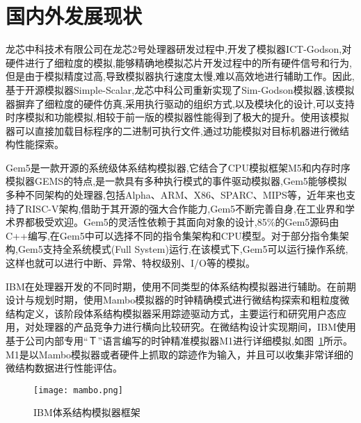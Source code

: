 \section{国内外发展现状}
龙芯中科技术有限公司在龙芯2号处理器研发过程中,开发了模拟器ICT-Godson\cite{gao2007simos},对硬件进行了细粒度的模拟,能够精确地模拟芯片开发过程中的所有硬件信号和行为,但是由于模拟精度过高,导致模拟器执行速度太慢,难以高效地进行辅助工作。因此,基于开源模拟器Simple-Scalar\cite{austin2002simplescalar},龙芯中科公司重新实现了Sim-Godson模拟器\cite{zhang2007sim},该模拟器摒弃了细粒度的硬件仿真,采用执行驱动的组织方式,以及模块化的设计,可以支持时序模拟和功能模拟\cite{zhang2007sim},相较于前一版的模拟器性能得到了极大的提升。使用该模拟器可以直接加载目标程序的二进制可执行文件,通过功能模拟对目标机器进行微结构性能探索\cite{desikan2001sim}。

Gem5是一款开源的系统级体系结构模拟器,它结合了CPU模拟框架M5和内存时序模拟器GEMS的特点,是一款具有多种执行模式的事件驱动模拟器\cite{许鹏2006一种应用于嵌入式系统中断控制},Gem5能够模拟多种不同架构的处理器,包括Alpha、ARM、X86、SPARC、MIPS等，近年来也支持了RISC-V架构,借助于其开源的强大合作能力,Gem5不断完善自身,在工业界和学术界都极受欢迎。Gem5的灵活性依赖于其面向对象的设计,85\%的Gem5源码由C++编写,在Gem5中可以选择不同的指令集架构和CPU模型。对于部分指令集架构,Gem5支持全系统模式(Full System)运行,在该模式下,Gem5可以运行操作系统,这样也就可以进行中断、异常、特权级别、I/O等的模拟。


IBM在处理器开发的不同时期，使用不同类型的体系结构模拟器进行辅助。在前期设计与规划时期，使用Mambo\cite{boh}模拟器的时钟精确模式进行微结构探索和粗粒度微结构定义，该阶段体系结构模拟器采用踪迹驱动方式\cite{ceze2003full}，主要运行和研究用户态应用，对处理器的产品竞争力进行横向比较研究\cite{kistlerexperiences}。在微结构设计实现期间，IBM使用基于公司内部专用“Ｔ”语言\cite{asaad2012cycle,chaix2019implementation}编写的时钟精准模拟器M1进行详细模拟\cite{kistlerexperiences},如图~\ref{fig:IBM}所示。M1是以Mambo模拟器或者硬件上抓取的踪迹作为输入，并且可以收集非常详细的微结构数据进行性能评估\cite{magnusson2002simics}。
\begin{figure}[h]
  \centering
  \texttt{[image: mambo.png]}
  \caption{IBM体系结构模拟器框架}
  \label{fig:IBM}
\end{figure}  


